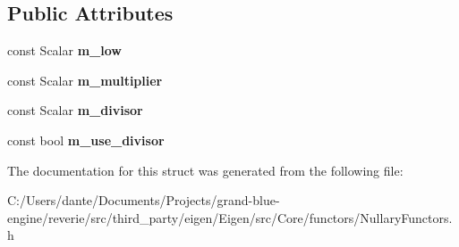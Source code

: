 \subsection*{Public Attributes}
\begin{DoxyCompactItemize}
\item 
\mbox{\label{struct_eigen_1_1internal_1_1linspaced__op__impl_3_01_scalar_00_01_packet_00_01true_01_4_a9eab1c684bcca5fff3f7841bacb189fb}} 
const Scalar {\bfseries m\+\_\+low}
\item 
\mbox{\label{struct_eigen_1_1internal_1_1linspaced__op__impl_3_01_scalar_00_01_packet_00_01true_01_4_afc3c2022438d153d96af7368bc8375c2}} 
const Scalar {\bfseries m\+\_\+multiplier}
\item 
\mbox{\label{struct_eigen_1_1internal_1_1linspaced__op__impl_3_01_scalar_00_01_packet_00_01true_01_4_ad07beb5652b1103949dd1c1b29666b94}} 
const Scalar {\bfseries m\+\_\+divisor}
\item 
\mbox{\label{struct_eigen_1_1internal_1_1linspaced__op__impl_3_01_scalar_00_01_packet_00_01true_01_4_aa4358c062dc96ee6b0af20d6cce7f279}} 
const bool {\bfseries m\+\_\+use\+\_\+divisor}
\end{DoxyCompactItemize}


The documentation for this struct was generated from the following file\+:\begin{DoxyCompactItemize}
\item 
C\+:/\+Users/dante/\+Documents/\+Projects/grand-\/blue-\/engine/reverie/src/third\+\_\+party/eigen/\+Eigen/src/\+Core/functors/Nullary\+Functors.\+h\end{DoxyCompactItemize}
